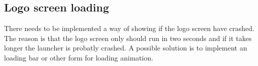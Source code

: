 \subsection{Logo screen loading}
\label{backlog:logo_screen_loading}

There needs to be implemented a way of showing if the logo screen have crashed. The reason is that the logo screen only should run in two seconds and if it takes longer the launcher is probatly crashed. 
A possible solution is to implement an loading bar or other form for loading animation.